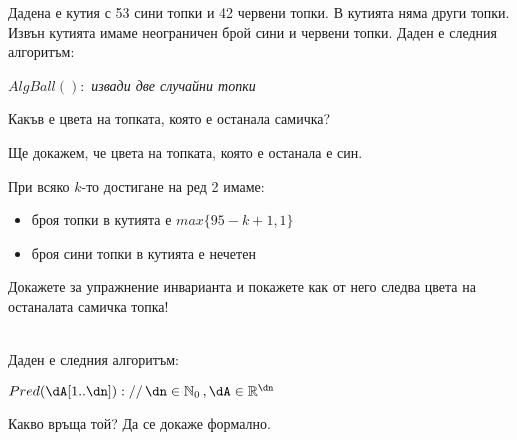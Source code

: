 \begin{problem}\label{prob-balls-in-box}
	Дадена е кутия с 53 сини топки и 42 червени топки. В кутията няма други топки. Извън кутията имаме неограничен брой сини и червени топки. Даден е следния алгоритъм:
	
	\begin{pseudocode}
		
		$AlgBall():$
		\Mybegin
		{
			{
				\emph{извади две случайни топки}\;
			}
		}
	\end{pseudocode}
	Какъв е цвета на топката, която е останала самичка?
\end{problem}

\begin{solution}
	Ще докажем, че цвета на топката, която е останала е син.
\end{solution}

\begin{boxinvariant*}{}{}
	При всяко $k$-то достигане на ред 2 имаме:
	\begin{itemize}
		\item броя топки в кутията е $max\{95-k+1,1\}$
		\item броя сини топки в кутията е нечетен
	\end{itemize}
\end{boxinvariant*}\leavevmode\newline
Докажете за упражнение инварианта и покажете как от него следва цвета на останалата самичка топка!\\\\

\begin{problem}\label{prob-2-1}
	Даден е следния алгоритъм:
	\begin{pseudocode}
		\SetKwData{dA}{A}
		\SetKwData{dn}{n}
		\SetKwData{dj}{j}
		\SetKwData{di}{i}
		
		$Pred(\dA[1..\dn])://\,\dn\in\mathbb{N}_0\,,\dA\in\mathbb{R}^{\dn}$
		\Mybegin
		{
			\Myfor{$\di\leftarrow1$ \KwTo $\dn-1$}
			{
				\Myfor{$\dj\leftarrow\di+1$ \KwTo $\dn$}
				{
					\If{$\dA[\di]=\dA[\dj]$}{\KwRet{\True\;}}
				}
			}
			\KwRet{\False\;}
		}
	\end{pseudocode}
	Какво връща той? Да се докаже формално.
\end{problem}

